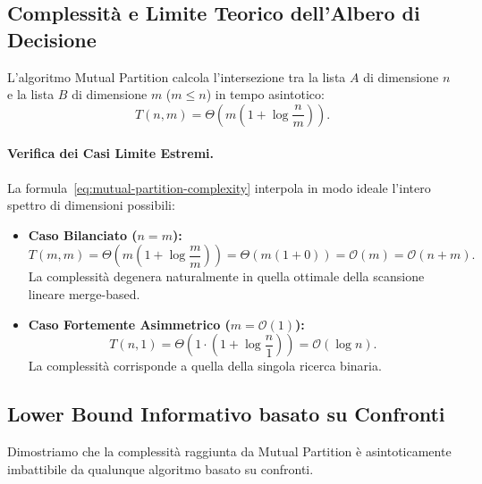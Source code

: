 \subsection{Complessità e Limite Teorico dell'Albero di Decisione}

\begin{theorem}
L'algoritmo Mutual Partition calcola l'intersezione tra la lista $A$ di dimensione $n$ e la lista $B$ di dimensione $m$ ($m \le n$) in tempo asintotico:
\begin{equation}
  T(n, m) = \Theta\left(m \left(1 + \log \frac{n}{m}\right)\right).
  \label{eq:mutual-partition-complexity}
\end{equation}
\end{theorem}

\paragraph{Verifica dei Casi Limite Estremi.}
La formula~\eqref{eq:mutual-partition-complexity} interpola in modo ideale l'intero spettro di dimensioni possibili:
\begin{itemize}
  \item \textbf{Caso Bilanciato ($n = m$):}
  \begin{equation}
    T(m, m) = \Theta\left(m \left(1 + \log \frac{m}{m}\right)\right) = \Theta(m (1 + 0)) = \mathcal{O}(m) = \mathcal{O}(n + m).
  \end{equation}
  La complessità degenera naturalmente in quella ottimale della scansione lineare merge-based.
  \item \textbf{Caso Fortemente Asimmetrico ($m = \mathcal{O}(1)$):}
  \begin{equation}
    T(n, 1) = \Theta\left(1 \cdot \left(1 + \log \frac{n}{1}\right)\right) = \mathcal{O}(\log n).
  \end{equation}
  La complessità corrisponde a quella della singola ricerca binaria.
\end{itemize}

\subsection{Lower Bound Informativo basato su Confronti}
Dimostriamo che la complessità raggiunta da Mutual Partition è asintoticamente imbattibile da qualunque algoritmo basato su confronti.

